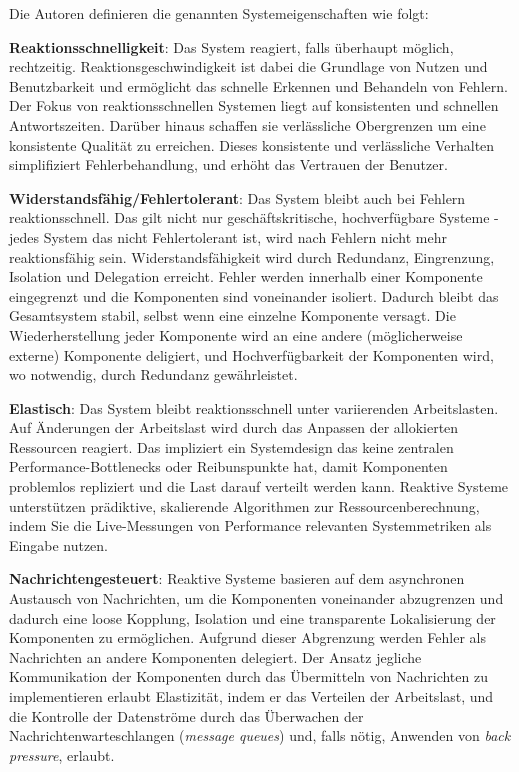 Die Autoren definieren die genannten Systemeigenschaften wie folgt:

\textbf{Reaktionsschnelligkeit}: Das System reagiert, falls überhaupt möglich, rechtzeitig. Reaktionsgeschwindigkeit ist dabei die Grundlage von Nutzen und
Benutzbarkeit und ermöglicht das schnelle Erkennen und Behandeln von Fehlern.
Der Fokus von reaktionsschnellen Systemen liegt auf konsistenten und schnellen Antwortszeiten. Darüber hinaus schaffen sie
verlässliche Obergrenzen um eine konsistente Qualität zu erreichen.
Dieses konsistente und verlässliche Verhalten simplifiziert Fehlerbehandlung, und erhöht das Vertrauen der Benutzer.

\textbf{Widerstandsfähig/Fehlertolerant}: Das System bleibt auch bei Fehlern reaktionsschnell. Das gilt nicht nur geschäftskritische, hochverfügbare Systeme -
jedes System das nicht Fehlertolerant ist, wird nach Fehlern nicht mehr reaktionsfähig sein.
Widerstandsfähigkeit wird durch Redundanz, Eingrenzung, Isolation und Delegation erreicht.
Fehler werden innerhalb einer Komponente eingegrenzt und die Komponenten sind voneinander isoliert. Dadurch bleibt das Gesamtsystem stabil, selbst
wenn eine einzelne Komponente versagt.
Die Wiederherstellung jeder Komponente wird an eine andere (möglicherweise externe) Komponente deligiert, und
Hochverfügbarkeit der Komponenten wird, wo notwendig, durch Redundanz gewährleistet.

\textbf{Elastisch}: Das System bleibt reaktionsschnell unter variierenden Arbeitslasten. Auf Änderungen der Arbeitslast wird durch das Anpassen der
allokierten Ressourcen reagiert. Das impliziert ein Systemdesign das keine zentralen Performance-Bottlenecks oder Reibunspunkte hat, damit
Komponenten problemlos repliziert und die Last darauf verteilt werden kann.
Reaktive Systeme unterstützen prädiktive, skalierende Algorithmen zur Ressourcenberechnung,
indem Sie die Live-Messungen von Performance relevanten Systemmetriken als Eingabe nutzen.

\textbf{Nachrichtengesteuert}: Reaktive Systeme basieren auf dem asynchronen Austausch von Nachrichten, um die Komponenten voneinander abzugrenzen und dadurch
eine loose Kopplung, Isolation und eine transparente Lokalisierung der Komponenten zu ermöglichen.
Aufgrund dieser Abgrenzung werden Fehler als Nachrichten an andere Komponenten delegiert.
Der Ansatz jegliche Kommunikation der Komponenten durch das Übermitteln von Nachrichten zu implementieren erlaubt Elastizität,
indem er das Verteilen der Arbeitslast, und die Kontrolle der Datenströme durch das Überwachen der Nachrichtenwarteschlangen
(\textit{message queues}) und, falls nötig, Anwenden von \textit{back pressure}, erlaubt.\parencite{ReactiveSystems}

